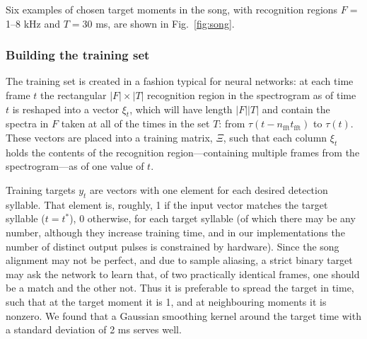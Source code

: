 \documentclass[10pt,letterpaper]{article}
\newcommand\fig[1]{Fig.~\ref{#1}}
\let\oldmarginpar\marginpar
\renewcommand{\marginpar}[1]{\oldmarginpar{\linespread{1}\scriptsize{#1}}}
\begin{document}
Six examples of chosen target moments in the song, with recognition
regions $F =$ 1--8 kHz and $T=30$ ms, are shown in \fig{fig:song}.




\subsubsection{Building the training set}

The training set is created in a fashion typical for neural networks:
at each time frame $t$ the rectangular $|F|\times |T|$ recognition
region in the spectrogram as of time $t$ is reshaped into a vector
$\xi_t$, which will have length $|F||T|$ and contain the spectra in
$F$ taken at all of the times in the set $T$: from
$\tau(t-n_\textrm{fft}t_\textrm{fft})$ to $\tau(t)$.  These vectors
are placed into a training matrix, $\Xi$, such that each column
$\xi_t$ holds the contents of the recognition region---containing
multiple frames from the spectrogram---as of one value of $t$.

Training targets $y_t$ are vectors with one element for each desired
detection syllable.  That element is, roughly, 1 if the input vector
matches the target syllable ($t=t^*$), 0 otherwise, for each target
syllable (of which there may be any number, although they increase
training time, and in our implementations the number of distinct
output pulses is constrained by hardware).  Since the song alignment
may not be perfect, and due to sample aliasing, a
strict binary target may ask the network to learn that, of two
practically identical frames, one should be a match and the other
not. Thus it is preferable to spread the target in time, such that at
the target moment it is 1, and at neighbouring moments it is
nonzero. We found that a Gaussian smoothing kernel around the target
time with a standard deviation of 2 ms serves well.
\end{document}

